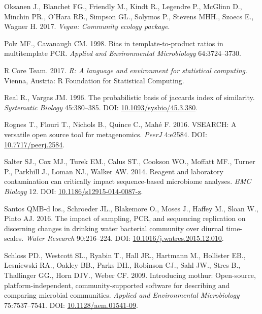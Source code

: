 \documentclass[12pt,]{article}
\begin{document}
\hypertarget{ref-vegan_citation}{}
Oksanen J., Blanchet FG., Friendly M., Kindt R., Legendre P., McGlinn
D., Minchin PR., O'Hara RB., Simpson GL., Solymos P., Stevens MHH.,
Szoecs E., Wagner H. 2017. \emph{Vegan: Community ecology package}.

\hypertarget{ref-polz_bias_1998}{}
Polz MF., Cavanaugh CM. 1998. Bias in template-to-product ratios in
multitemplate PCR. \emph{Applied and Environmental Microbiology}
64:3724--3730.

\hypertarget{ref-r_citation_2017}{}
R Core Team. 2017. \emph{R: A language and environment for statistical
computing}. Vienna, Austria: R Foundation for Statistical Computing.

\hypertarget{ref-Real1996}{}
Real R., Vargas JM. 1996. The probabilistic basis of jaccards index of
similarity. \emph{Systematic Biology} 45:380--385. DOI:
\href{https://doi.org/10.1093/sysbio/45.3.380}{10.1093/sysbio/45.3.380}.

\hypertarget{ref-vsearch_Rognes_2016}{}
Rognes T., Flouri T., Nichols B., Quince C., Mahé F. 2016. VSEARCH: A
versatile open source tool for metagenomics. \emph{PeerJ} 4:e2584. DOI:
\href{https://doi.org/10.7717/peerj.2584}{10.7717/peerj.2584}.

\hypertarget{ref-contamination_Salter2014}{}
Salter SJ., Cox MJ., Turek EM., Calus ST., Cookson WO., Moffatt MF.,
Turner P., Parkhill J., Loman NJ., Walker AW. 2014. Reagent and
laboratory contamination can critically impact sequence-based microbiome
analyses. \emph{BMC Biology} 12. DOI:
\href{https://doi.org/10.1186/s12915-014-0087-z}{10.1186/s12915-014-0087-z}.

\hypertarget{ref-BautistadelosSantos2016}{}
Santos QMB-d los., Schroeder JL., Blakemore O., Moses J., Haffey M.,
Sloan W., Pinto AJ. 2016. The impact of sampling, PCR, and sequencing
replication on discerning changes in drinking water bacterial community
over diurnal time-scales. \emph{Water Research} 90:216--224. DOI:
\href{https://doi.org/10.1016/j.watres.2015.12.010}{10.1016/j.watres.2015.12.010}.

\hypertarget{ref-mothur_schloss_2009}{}
Schloss PD., Westcott SL., Ryabin T., Hall JR., Hartmann M., Hollister
EB., Lesniewski RA., Oakley BB., Parks DH., Robinson CJ., Sahl JW.,
Stres B., Thallinger GG., Horn DJV., Weber CF. 2009. Introducing mothur:
Open-source, platform-independent, community-supported software for
describing and comparing microbial communities. \emph{Applied and
Environmental Microbiology} 75:7537--7541. DOI:
\href{https://doi.org/10.1128/aem.01541-09}{10.1128/aem.01541-09}.
\end{document}
